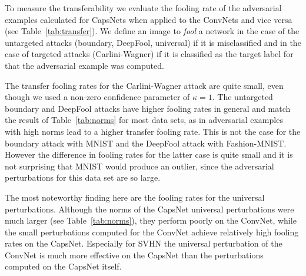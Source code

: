 To measure the transferability we evaluate the fooling rate of the adversarial examples calculated for CapsNets when applied to the ConvNets and vice versa (see Table~\ref{tab:transfer}). We define an image to \emph{fool} a network in the case of the untargeted attacks (boundary, DeepFool, universal) if it is misclassified and in the case of targeted attacks (Carlini-Wagner) if it is classified as the target label for that the adversarial example was computed. 

The transfer fooling rates for the Carlini-Wagner attack are quite small, even though we used a non-zero confidence parameter of $\kappa=1$. The untargeted boundary and DeepFool attacks have higher fooling rates in general and match the result of Table~\ref{tab:norms} for most data sets, as in adversarial examples with high norms lead to a higher transfer fooling rate. This is not the case for the boundary attack with MNIST and the DeepFool attack with Fashion-MNIST. However the difference in fooling rates for the latter case is quite small and it is not surprising that MNIST would produce an outlier, since the adversarial perturbations for this data set are so large. 


The most noteworthy finding here are the fooling rates for the universal perturbations. Although the norms of the CapsNet universal perturbations were much larger (see Table~\ref{tab:norms}), they perform poorly on the ConvNet, while the small perturbations computed for the ConvNet achieve relatively high fooling rates on the CapsNet. Especially for SVHN the universal perturbation of the ConvNet is much more effective on the CapsNet than the perturbations computed on the CapsNet itself.

